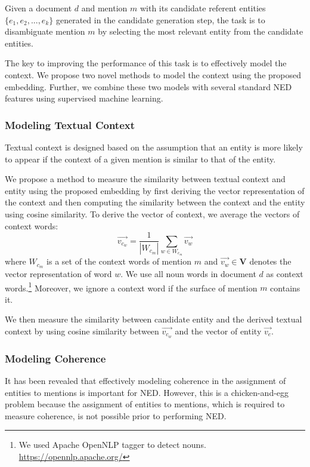 \documentclass[11pt,letterpaper]{article}
\begin{document}
Given a document $d$ and mention $m$ with its candidate referent entities $\{e_1, e_2, ..., e_k\}$ generated in the candidate generation step, the task is to disambiguate mention $m$ by selecting the most relevant entity from the candidate entities.

The key to improving the performance of this task is to effectively model the context.
We propose two novel methods to model the context using the proposed embedding.
Further, we combine these two models with several standard NED features using supervised machine learning.

\subsubsection{Modeling Textual Context}
\label{subsubsec:textual-context}

Textual context is designed based on the assumption that an entity is more likely to appear if the context of a given mention is similar to that of the entity.

We propose a method to measure the similarity between textual context and entity using the proposed embedding by first deriving the vector representation of the context and then computing the similarity between the context and the entity using cosine similarity.
To derive the vector of context, we average the vectors of context words:
\begin{equation}
\vec{v_{c_w}} = \frac{1}{|W_{c_m}|}\sum_{w \in W_{c_m}}\vec{v_{w}}
\label{eq:word-vector-average}
\end{equation}
where $W_{c_m}$ is a set of the context words of mention $m$ and $\vec{v_w} \in \mathbf{V}$ denotes the vector representation of word $w$.
We use all noun words in document $d$ as context words.\footnote{We used Apache OpenNLP tagger to detect nouns. {\url{https://opennlp.apache.org/}}}
Moreover, we ignore a context word if the surface of mention $m$ contains it.

We then measure the similarity between candidate entity and the derived textual context by using cosine similarity between $\vec{v_{c_w}}$ and the vector of entity $\vec{v_e}$.

\subsubsection{Modeling Coherence}
\label{subsubsec:coherence}

It has been revealed that effectively modeling coherence in the assignment of entities to mentions is important for NED.
However, this is a chicken-and-egg problem because the assignment of entities to mentions, which is required to measure coherence, is not possible prior to performing NED.
\end{document}
